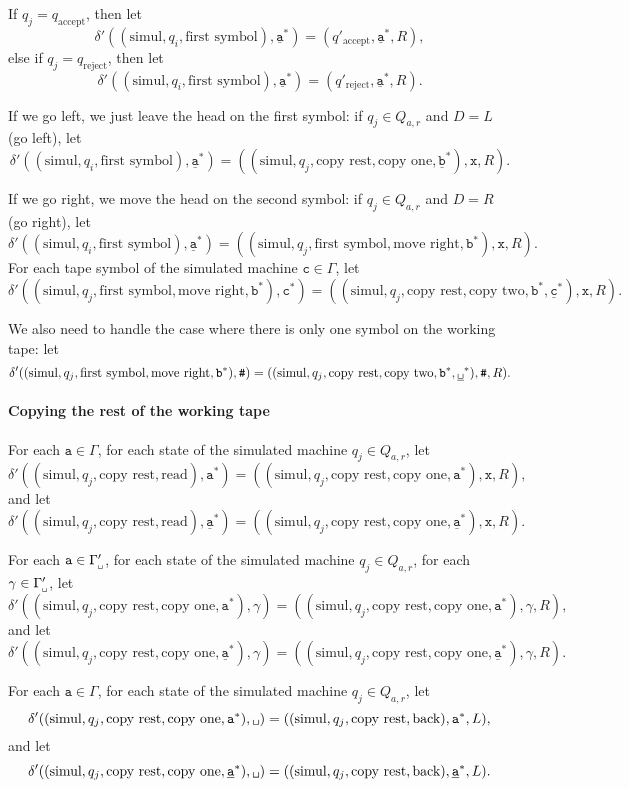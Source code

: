 \documentclass{article}
\newcommand{\obullet}[1]{\ensuremath{#1^*}}
\newcommand{\0}{\texttt{\textvisiblespace}}
\newcommand{\°}{\obullet{\0}}
\newcommand{\BB}{\obullet{\underline{\0}}}
\newcommand{\A}{\obullet{\s}}
\newcommand{\Q}{\obullet{\w}}
\renewcommand{\C}{\obullet{\y}}
\newcommand{\HA}{\obullet{\underline{\s}}}
\newcommand{\HQ}{\obullet{\underline{\w}}}
\newcommand{\HC}{\obullet{\underline{\y}}}
\newcommand{\s}{\texttt{a}}
\newcommand{\w}{\texttt{b}}
\newcommand{\y}{\texttt{c}}
\newcommand{\X}{\texttt{x}}
\newcommand{\e}{\texttt{\#}}
\newcommand{\qpa}{q'_\text{accept}}
\newcommand{\qpr}{q'_\text{reject}}
\newcommand{\gpwb}{\Gamma'_{\0{}}}
\newcommand{\qwar}{Q_{a,r}}
\begin{document}
If $q_j = q_\text{accept}$, then
let $$\delta'((\text{simul}, q_i, \text{first symbol}),\HA)
=(\qpa,\HA, R),$$
else if $q_j = q_\text{reject}$, then
let $$\delta'((\text{simul}, q_i, \text{first symbol}),\HA)
=(\qpr,\HA, R).$$

If we go left, we just leave the head on the
first symbol:
if $q_j \in \qwar$ and $D=L$ (go left),
let $$\delta'((\text{simul}, q_i, \text{first symbol}),\HA)=((\text{simul},
q_j, \text{copy rest}, \text{copy one}, \HQ),\X,R).$$

If we go right, we move the head on the second symbol:
if $q_j \in \qwar$ and $D=R$ (go right),
let $$\delta'((\text{simul}, q_i, \text{first symbol}),\HA)=((\text{simul},
q_j, \text{first symbol}, \text{move right}, \Q),\X,R).$$
For each tape symbol of the simulated machine $\y \in \Gamma$,
let $$\delta'((\text{simul}, q_j, \text{first symbol}, \text{move right}, \Q), \C)=
((\text{simul}, q_j, \text{copy rest}, \text{copy two}, \Q, \HC),\X,R).$$

We also need to handle the case where there is only one symbol on the working
tape:
let $$\delta'((\text{simul}, q_j, \text{first symbol}, \text{move right}, \Q), \e)=
((\text{simul}, q_j, \text{copy rest}, \text{copy two}, \Q, \BB),\e,R).$$

\paragraph{Copying the rest of the working tape}
For each $\s \in\Gamma$,
for each state of the simulated machine $q_j \in \qwar$,
let $$\delta'((\text{simul},q_j,\text{copy rest}, \text{read}), \A)
= ((\text{simul},q_j, \text{copy rest},\text{copy one}, \A), \X, R),$$
and let $$\delta'((\text{simul},q_j,\text{copy rest}, \text{read}), \HA)
= ((\text{simul},q_j, \text{copy rest},\text{copy one}, \HA), \X, R).$$

For each $\s \in \gpwb$,
for each state of the simulated machine $q_j \in \qwar$,
for each $\gamma \in\gpwb$,
let $$\delta'((\text{simul}, q_j, \text{copy rest}, \text{copy one}, \A), \gamma)
= ((\text{simul}, q_j, \text{copy rest}, \text{copy one}, \A), \gamma, R),$$
and
let $$\delta'((\text{simul}, q_j, \text{copy rest}, \text{copy one}, \HA), \gamma)
= ((\text{simul}, q_j, \text{copy rest}, \text{copy one}, \HA), \gamma, R).$$

For each $\s \in\Gamma$,
for each state of the simulated machine $q_j \in \qwar$,
let $$\delta'((\text{simul},q_j, \text{copy rest},\text{copy one}, \A), \0{})
= ((\text{simul}, q_j, \text{copy rest}, \text{back}), \A, L),$$
and
let $$\delta'((\text{simul},q_j, \text{copy rest},\text{copy one}, \HA), \0{})
= ((\text{simul}, q_j, \text{copy rest}, \text{back}), \HA, L).$$
\end{document}
